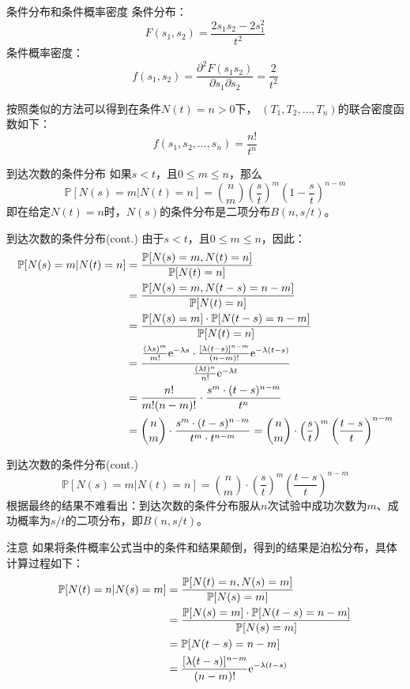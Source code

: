 \documentclass[t]{beamer}
\renewcommand{\Pr}{\mathbb{P}}
\begin{document}
\begin{frame}{条件分布和条件概率密度}
    条件分布：
    \[F(s_1,s_2)=\frac{2s_1s_2-2s^2_1}{t^2}\]
    条件概率密度：\[f(s_1,s_2)=\frac{\partial^2 F(s_1s_2)}{\partial s_1\partial s_2}=\frac{2}{t^2} \]


    按照类似的方法可以得到在条件$N(t)=n>0$下， $(T_1,T_2,\ldots,T_n)$的联合密度函数如下：
\[f(s_1,s_2,\ldots,s_n)=\frac{n!}{t^n}\]
\end{frame}


\begin{frame}{到达次数的条件分布}
    如果$s<t$，且$0\le m\le n$，那么
\[\Pr[N(s)=m|N(t)=n]={n \choose m}\left(\frac{s}{t}\right)^m\left(1-\frac{s}{t}\right)^{n-m} \]
即在给定$N(t)=n$时，$N(s)$的条件分布是二项分布$B(n,s/t)$。
\end{frame}


\begin{frame}{到达次数的条件分布(cont.)}
    由于$s<t$，且$0\le m\le n$，因此：
\[\begin{split}
\Pr[N(s)=m|N(t)=n]&=\frac{\Pr[N(s)=m,N(t)=n]}{\Pr[N(t)=n]}\\
&=\frac{\Pr[N(s)=m, N(t-s)=n-m]}{\Pr[N(t)=n]}\\
&=\frac{\Pr[N(s)=m]\cdot\Pr[N(t-s)=n-m]}{\Pr[N(t)=n]}\\
&=\frac{\frac{(\lambda s)^m}{m!}{\rm e}^{-\lambda s}\cdot \frac{[\lambda (t-s)]^{n-m}}{(n-m)!}{\rm e}^{-\lambda (t-s)}}{\frac{(\lambda t)^n}{n!}{\rm e}^{-\lambda t}}\\&=\frac{n!}{m!(n-m)!}\cdot \frac{s^m\cdot (t-s)^{n-m}}{t^n}\\
&={n \choose m} \cdot \frac{s^m\cdot (t-s)^{n-m}}{t^m\cdot t^{n-m}}={n \choose m} \cdot \left(\frac{s}{t} \right)^m \left(\frac{t-s}{t} \right) ^{n-m} 
\end{split}\]
\end{frame}


\begin{frame}{到达次数的条件分布(cont.)}
\[\Pr[N(s)=m|N(t)=n]={n \choose m} \cdot \left(\frac{s}{t} \right)^m \left(\frac{t-s}{t} \right) ^{n-m} \]
    根据最终的结果不难看出：到达次数的条件分布服从$n$次试验中成功次数为$m$、成功概率为$s/t$的二项分布，即$B\left(n,s/t\right)$。
\end{frame}


\begin{frame}{注意}
    如果将条件概率公式当中的条件和结果颠倒，得到的结果是泊松分布，具体计算过程如下：
\[\begin{split}
\Pr[N(t)=n|N(s)=m]&=\frac{\Pr[N(t)=n,N(s)=m]}{\Pr[N(s)=m]}\\
&=\frac{\Pr[N(s)=m]\cdot\Pr[N(t-s)=n-m]}{\Pr[N(s)=m]}\\
&=\Pr[N(t-s)=n-m]\\
&=\frac{[\lambda(t-s)]^{n-m}}{(n-m)!}{\rm e}^{-\lambda(t-s)} 
\end{split}\]
\end{frame}
\end{document}
